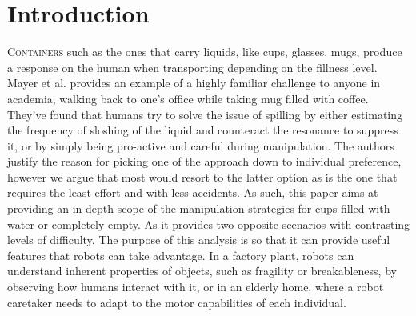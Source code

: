 \section{Introduction}

\lettrine{C}{ontainers} such as the ones that carry liquids, like cups, glasses, mugs, produce a response on the human when transporting depending on the fillness level. Mayer et al. \cite{mayer_walking_2012} provides an example of a highly familiar challenge to anyone in academia, walking back to one's office while taking mug filled with coffee. They've found that humans try to solve the issue of spilling by either estimating the frequency of sloshing of the liquid and counteract the resonance to suppress it, or by simply being pro-active and careful during manipulation. The authors justify the reason for picking one of the approach down to individual preference, however we argue that most would resort to the latter option as is the one that requires the least effort and with less accidents. As such, this paper aims at providing an in depth scope of the manipulation strategies for cups filled with water or completely empty. As it provides two opposite scenarios with contrasting levels of difficulty. The purpose of this analysis is so that it can provide useful features that robots can take advantage. In a factory plant, robots can understand inherent properties of objects, such as fragility or breakableness, by observing how humans interact with it, or in an elderly home, where a robot caretaker needs to adapt to the motor capabilities of each individual. 



